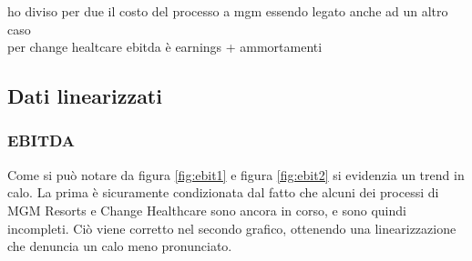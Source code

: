 \documentclass[12pt,a4paper,openright,twoside]{report}
\begin{document}
ho diviso per due il costo del processo a mgm essendo legato anche ad un altro caso\\

per change healtcare ebitda \`e earnings + ammortamenti\\

\subsection{Dati linearizzati}
\subsubsection{EBITDA}
Come si pu\`o notare da figura \ref{fig:ebit1} e figura \ref{fig:ebit2} si evidenzia un trend in calo. La prima \`e sicuramente condizionata dal fatto che alcuni dei processi di MGM Resorts e Change Healthcare sono ancora in corso, e sono quindi incompleti. Ci\`o viene corretto nel secondo grafico, ottenendo una linearizzazione che denuncia un calo meno pronunciato.\\
\end{document}
